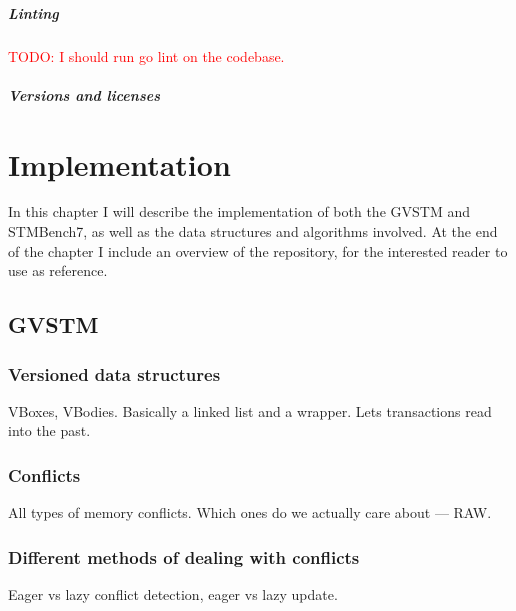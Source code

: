 \documentclass[12pt,a4paper,oneside,openright]{report}
\newcommand{\todo}[1]{\textcolor{red}{TODO: #1}}
\begin{document}
\paragraph{Linting}
\todo{I should run go lint on the codebase.}

\paragraph{Versions and licenses}




\chapter{Implementation}

In this chapter I will describe the implementation of both the GVSTM
and STMBench7, as well as the data structures and algorithms
involved. At the end of the chapter I include an overview of the
repository, for the interested reader to use as reference.

\section{GVSTM}
\label{sec:impl:gvstm}

\subsection{Versioned data structures}
\label{sec:impl:vers-data-struct}

VBoxes, VBodies. Basically a linked list and a wrapper. Lets
transactions read into the past.

\subsection{Conflicts}
\label{sec:impl:conflicts}

All types of memory conflicts. Which ones do we actually care about
--- RAW.

\subsection{Different methods of dealing with conflicts}
\label{sec:impl:diff-meth-deal}

Eager vs lazy conflict detection, eager vs lazy update.
\end{document}
